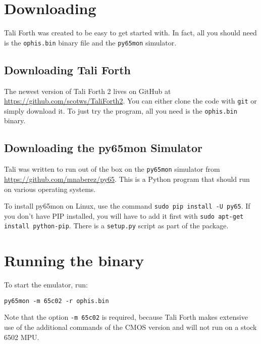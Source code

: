 \section{Downloading}

Tali Forth was created to be easy to get started with. In fact, all you should
need is the \texttt{ophis.bin} binary file and the
\texttt{py65mon} simulator.

\subsection{Downloading Tali Forth}

The newest version of Tali Forth 2 lives on GitHub at
\href{https://github.com/scotws/TaliForth2}{https://github.com/scotws/TaliForth2}.
You can either clone the code with \texttt{git} or
simply download it. To just try the program, all you need is the
\texttt{ophis.bin} binary. 

\subsection{Downloading the py65mon Simulator}

Tali was written to run out of the box on the 
\texttt{py65mon} simulator from
\href{https://github.com/mnaberez/py65}{https://github.com/mnaberez/py65}. This
is a Python program that should run on various operating systems. 

To install py65mon on Linux, use the command \texttt{sudo pip
install -U py65}. If you don't have PIP installed, you will have to
add it first with \texttt{sudo apt-get install python-pip}.  There is a
\texttt{setup.py} script as part of the package.

\section{Running the binary}

To start the emulator, run:
\begin{lstlisting}[frame=lines]
        py65mon -m 65c02 -r ophis.bin
\end{lstlisting}

\noindent Note that the option \texttt{-m 65c02} is required, because Tali Forth
makes extensive use of the additional commands of the CMOS version and will not
run on a stock 6502 MPU.

